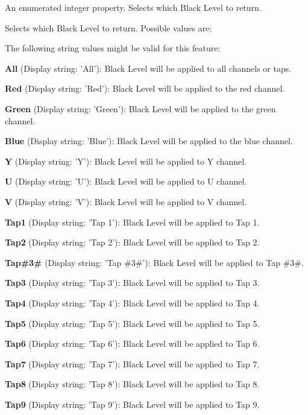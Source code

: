 An enumerated integer property. Selects which Black Level to return. 

Selects which Black Level to return. Possible values are\+:

The following string values might be valid for this feature\+:
\begin{DoxyItemize}
\item {\bfseries All} (Display string\+: 'All')\+: Black Level will be applied to all channels or taps.
\item {\bfseries Red} (Display string\+: 'Red')\+: Black Level will be applied to the red channel.
\item {\bfseries Green} (Display string\+: 'Green')\+: Black Level will be applied to the green channel.
\item {\bfseries Blue} (Display string\+: 'Blue')\+: Black Level will be applied to the blue channel.
\item {\bfseries Y} (Display string\+: 'Y')\+: Black Level will be applied to Y channel.
\item {\bfseries U} (Display string\+: 'U')\+: Black Level will be applied to U channel.
\item {\bfseries V} (Display string\+: 'V')\+: Black Level will be applied to V channel.
\item {\bfseries Tap1} (Display string\+: 'Tap 1')\+: Black Level will be applied to Tap 1.
\item {\bfseries Tap2} (Display string\+: 'Tap 2')\+: Black Level will be applied to Tap 2.
\item {\bfseries Tap\#3\#} (Display string\+: 'Tap \#3\#')\+: Black Level will be applied to Tap \#3\#.
\item {\bfseries Tap3} (Display string\+: 'Tap 3')\+: Black Level will be applied to Tap 3.
\item {\bfseries Tap4} (Display string\+: 'Tap 4')\+: Black Level will be applied to Tap 4.
\item {\bfseries Tap5} (Display string\+: 'Tap 5')\+: Black Level will be applied to Tap 5.
\item {\bfseries Tap6} (Display string\+: 'Tap 6')\+: Black Level will be applied to Tap 6.
\item {\bfseries Tap7} (Display string\+: 'Tap 7')\+: Black Level will be applied to Tap 7.
\item {\bfseries Tap8} (Display string\+: 'Tap 8')\+: Black Level will be applied to Tap 8.
\item {\bfseries Tap9} (Display string\+: 'Tap 9')\+: Black Level will be applied to Tap 9.

\end{DoxyItemize}
